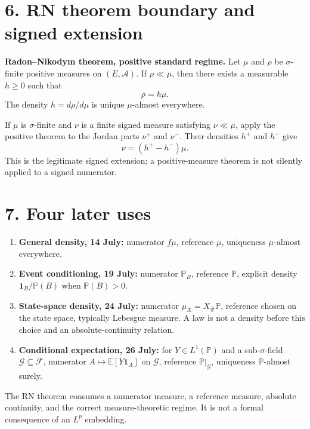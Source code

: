 \section*{6. RN theorem boundary and signed extension}

\textbf{Radon--Nikodym theorem, positive standard regime.}
Let $\mu$ and $\rho$ be $\sigma$-finite positive measures on $(E,\mathcal A)$. If $\rho\ll\mu$, then there exists a measurable $h\ge0$ such that
\[
\rho=h\mu.
\]
The density $h=d\rho/d\mu$ is unique $\mu$-almost everywhere.

If $\mu$ is $\sigma$-finite and $\nu$ is a finite signed measure satisfying $\nu\ll\mu$, apply the positive theorem to the Jordan parts $\nu^+$ and $\nu^-$. Their densities $h^+$ and $h^-$ give
\[
\nu=(h^+-h^-)\mu.
\]
This is the legitimate signed extension; a positive-measure theorem is not silently applied to a signed numerator.

\section*{7. Four later uses}

\begin{enumerate}
  \item \textbf{General density, 14 July:} numerator $f\mu$, reference $\mu$, uniqueness $\mu$-almost everywhere.
  \item \textbf{Event conditioning, 19 July:} numerator $\mathbb P_B$, reference $\mathbb P$, explicit density $\mathbf 1_B/\mathbb P(B)$ when $\mathbb P(B)>0$.
  \item \textbf{State-space density, 24 July:} numerator $\mu_X=X_\#\mathbb P$, reference chosen on the state space, typically Lebesgue measure. A law is not a density before this choice and an absolute-continuity relation.
  \item \textbf{Conditional expectation, 26 July:} for $Y\in L^1(\mathbb P)$ and a sub-$\sigma$-field $\mathcal G\subseteq\mathcal F$, numerator $A\mapsto\mathbb E[Y\mathbf 1_A]$ on $\mathcal G$, reference $\mathbb P|_{\mathcal G}$, uniqueness $\mathbb P$-almost surely.
\end{enumerate}

The RN theorem consumes a numerator measure, a reference measure, absolute continuity, and the correct measure-theoretic regime. It is not a formal consequence of an $L^p$ embedding.
